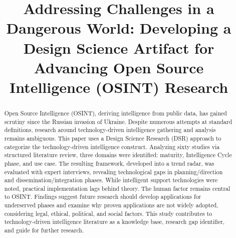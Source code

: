 \documentclass[10pt]{article}
\title{Addressing Challenges in a Dangerous World: Developing a Design Science Artifact for Advancing Open Source Intelligence (OSINT) Research}
\date{}
\begin{document}
\maketitle
\begin{abstract}
    Open Source Intelligence (OSINT), deriving intelligence from public data, has gained scrutiny since the Russian invasion of Ukraine. Despite numerous attempts at standard definitions, research around technology-driven intelligence gathering and analysis remains ambiguous. This paper uses a Design Science Research (DSR) approach to categorize the technology-driven intelligence construct. Analyzing sixty studies via structured literature review, three domains were identified: maturity, Intelligence Cycle phase, and use case. The resulting framework, developed into a trend radar, was evaluated with expert interviews, revealing technological gaps in planning/direction and dissemination/integration phases. While intelligent support technologies were noted, practical implementation lags behind theory. The human factor remains central to OSINT. Findings suggest future research should develop applications for underserved phases and examine why proven applications are not widely adopted, considering legal, ethical, political, and social factors. This study contributes to technology-driven intelligence literature as a knowledge base, research gap identifier, and guide for further research.
\end{abstract}
\end{document}
